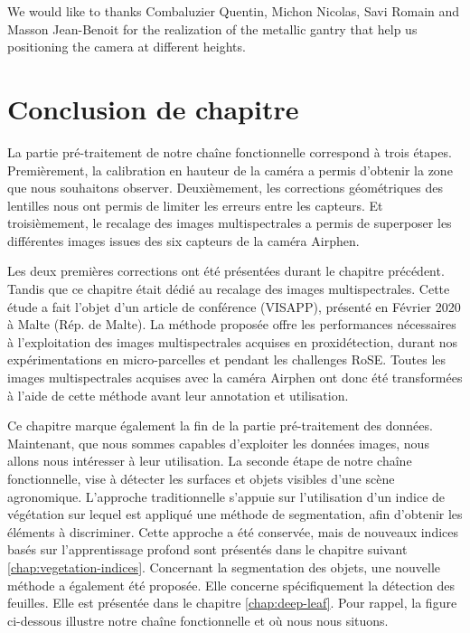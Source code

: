 \documentclass[../thesis.tex]{subfiles}
\begin{document}
	\par We would like to thanks Combaluzier Quentin, Michon Nicolas, Savi Romain and Masson Jean-Benoit
	for the realization of the metallic gantry that help us positioning the camera at different heights.
	
	\newpage
	\section{Conclusion de chapitre}
    
	La partie pré-traitement de notre chaîne fonctionnelle correspond à trois étapes. Premièrement, la calibration en hauteur de la caméra a permis d'obtenir la zone que nous souhaitons observer. Deuxièmement, les corrections géométriques des lentilles nous ont permis de limiter les erreurs entre les capteurs. Et troisièmement, le recalage des images multispectrales a permis de superposer les différentes images issues des six capteurs de la caméra Airphen.
    
    Les deux premières corrections ont été présentées durant le chapitre précédent. Tandis que ce chapitre était dédié au recalage des images multispectrales. Cette étude a fait l'objet d'un article de conférence (VISAPP), présenté en Février 2020 à Malte (Rép. de Malte). La méthode proposée offre les performances nécessaires à l'exploitation des images multispectrales acquises en proxidétection, durant nos expérimentations en micro-parcelles et pendant les challenges RoSE. Toutes les images multispectrales acquises avec la caméra Airphen ont donc été transformées à l'aide de cette méthode avant leur annotation et utilisation.
    
    Ce chapitre marque également la fin de la partie pré-traitement des données. Maintenant, que nous sommes capables d'exploiter les données images, nous allons nous intéresser à leur utilisation. La seconde étape de notre chaîne fonctionnelle, vise à détecter les surfaces et objets visibles d'une scène agronomique. L'approche traditionnelle s'appuie sur l'utilisation d'un indice de végétation sur lequel est appliqué une méthode de segmentation, afin d'obtenir les éléments à discriminer. Cette approche a été conservée, mais de nouveaux indices basés sur l'apprentissage profond sont présentés dans le chapitre suivant \ref{chap:vegetation-indices}. Concernant la segmentation des objets, une nouvelle méthode a également été proposée. Elle concerne spécifiquement la détection des feuilles. Elle est présentée dans le chapitre \ref{chap:deep-leaf}. Pour rappel, la figure ci-dessous illustre notre chaîne fonctionnelle et où nous nous situons.
	
\end{document}
